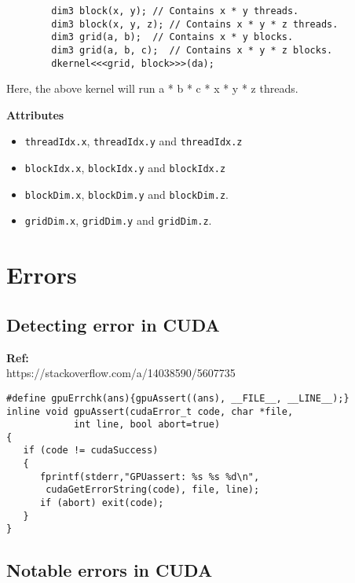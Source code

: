 \begin{multicols*}{3}
\begin{mdframed}[backgroundcolor=gray!10,linecolor=Firebrick4]
	\begin{verbatim}
		dim3 block(x, y); // Contains x * y threads.
		dim3 block(x, y, z); // Contains x * y * z threads.
		dim3 grid(a, b);  // Contains x * y blocks.
		dim3 grid(a, b, c);  // Contains x * y * z blocks.
		dkernel<<<grid, block>>>(da);
	\end{verbatim}
	Here, the above kernel will run a * b * c * x * y * z threads.
\end{mdframed}
\textbf{Attributes}\\
\begin{itemize}
	\item \texttt{threadIdx.x}, \texttt{threadIdx.y} and \texttt{threadIdx.z}
	\item \texttt{blockIdx.x}, \texttt{blockIdx.y} and \texttt{blockIdx.z}
	\item \texttt{blockDim.x}, \texttt{blockDim.y} and \texttt{blockDim.z}.
	\item \texttt{gridDim.x}, \texttt{gridDim.y} and \texttt{gridDim.z}.
\end{itemize}

\vfill\null
\columnbreak

 


\vfill\null
\columnbreak

\section*{Errors}
\subsection*{Detecting error in CUDA}

\textbf{Ref:}\\
https://stackoverflow.com/a/14038590/5607735

\begin{verbatim}
#define gpuErrchk(ans){gpuAssert((ans), __FILE__, __LINE__);}
inline void gpuAssert(cudaError_t code, char *file,
            int line, bool abort=true)
{
   if (code != cudaSuccess)
   {
      fprintf(stderr,"GPUassert: %s %s %d\n",
       cudaGetErrorString(code), file, line);
      if (abort) exit(code);
   }
} 
\end{verbatim}

\subsection*{Notable errors in CUDA}

\end{multicols*}

